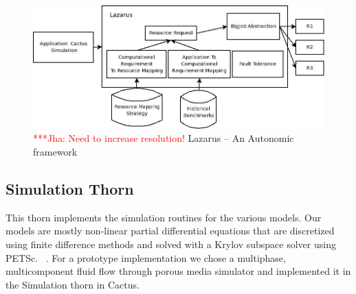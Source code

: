 \documentclass[conference,final]{IEEEtran}
\newcommand{\jhanote}[1]{ {\textcolor{red} { ***Jha: #1 }}}
\begin{document}
\begin{figure}
\begin{center}
\includegraphics[scale=0.3]{./figures/Lazarus_01.jpeg}
\end{center}
\caption{\jhanote{Need to increase resolution!}  Lazarus -- An
  Autonomic framework}

\label{fig:application_architecture}
\end{figure}




\subsection{Simulation Thorn}

This thorn implements the simulation routines for the various models.
Our models are mostly non-linear partial differential equations that
are discretized using finite difference methods and solved with a
Krylov subspace solver using PETSc. ~\cite{PETSc}. For a prototype
implementation we chose a multiphase, multicomponent fluid flow
through porous media simulator and implemented it in the Simulation
thorn in Cactus.

\end{document}
